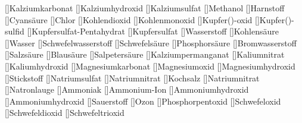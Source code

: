 []{Kalziumkarbonat}%
[]{Kalziumhydroxid}%
[]{Kalziumsulfat}%
[]{Methanol}%
[]{Harnstoff}%
[]{Cyansäure}%
[]{Chlor}%
[]{Kohlendioxid}%
[]{Kohlenmonoxid}%
[]{Kupfer()-oxid}%
[]{Kupfer()-sulfid}%
[]{Kupfersulfat-Pentahydrat}%
[]{Kupfersulfat}%
[]{Wasserstoff}%
[]{Kohlensäure}%
[]{Wasser}%
[]{Schwefelwasserstoff}%
[]{Schwefelsäure}%
[]{Phosphors\"aure}%
[]{Bromwasserstoff}%
[]{Salzs\"aure}%
[]{Blausäure}%
[]{Salpetersäure}%
[]{Kalziumpermanganat}%
[]{Kaliumnitrat}%
[]{Kaliumhydroxid}%
[]{Magnesiumkarbonat}%
[]{Ma\-gne\-sium\-oxid}%
[]{Magnesiumhydroxid}%
[]{Stickstoff}%
[]{Natriumsulfat}%
[]{Natriumnitrat}%
[]{Kochsalz}%
[]{Natriumnitrat}%
[]{Natronlauge}%
[]{Ammoniak}%
[]{Ammonium-Ion}%
[]{Ammoniumhydroxid}%
[]{Ammoniumhydroxid}%
[]{Sauerstoff}%
[]{Ozon}%
[]{Phosphorpentoxid}%
[]{Schwefeloxid}%
[]{Schwefeldioxid}%
[]{Schwefeltrioxid}%